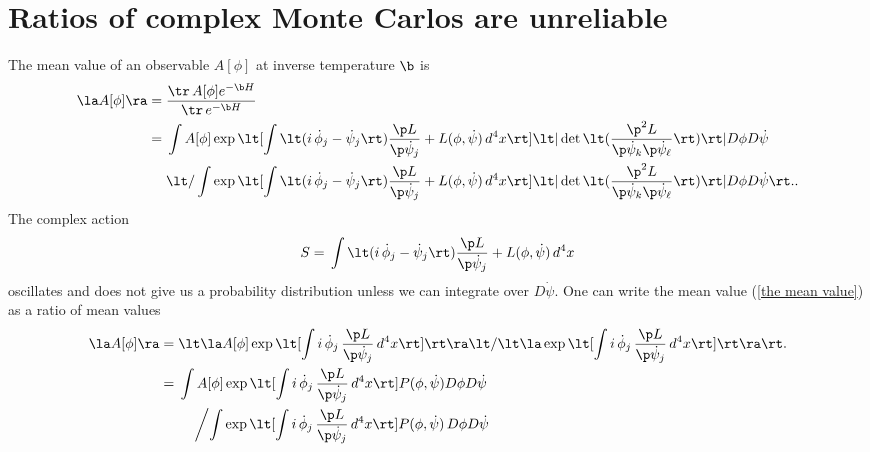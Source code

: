 \documentclass[prd,preprint,floatfix,showpacs]{revtex4-1}
\begin{document}
\appendix

\section{Ratios of complex Monte Carlos are unreliable
\label {Ratios of complex Monte Carlos are unreliable}}

The mean value of an observable
\( A[\phi] \) at inverse temperature \( \b \) is
\begin{equation}
   \begin{split}    
\la A[\phi] \ra ={}& \frac{ \tr \, A[\phi] e^{- \b H} }
{ \tr \, e^{- \b H} } \\
={}&
\int A[\phi] \exp \lt[ \int    \lt( i \, \dot \phi_j 
-  \dot \psi_j \rt) \frac{ \p  L }{ \p \dot \psi_j }  
+ L(\phi, \dot \psi) \, d^4x \rt] 
{\lt| \det \lt( \frac{ \p^2  L }
 { \p \dot \psi_k \p \dot \psi_\ell }  \rt) \rt| }
D\phi D\dot\psi 
\\
{}& \lt/ \int \exp \lt[ \int  \lt( i \, \dot \phi_j 
-  \dot \psi_j \rt) \frac{ \p  L }{ \p \dot \psi_j }  
+ L(\phi, \dot \psi) \, d^4x \rt] 
{\lt| \det \lt( \frac{ \p^2  L }
 { \p \dot \psi_k \p \dot \psi_\ell }  \rt) \rt| } 
 D\phi D\dot\psi \rt. .
 \label {the mean value}
\end{split}
\end{equation} 
The complex action 
\begin{equation}
S = {} \int \lt( i \, \dot \phi_j 
	-  \dot \psi_j \rt) \frac{ \p  L }{ \p \dot \psi_j }  
	+ L(\phi, \dot \psi)\, d^4x
	\label {the complex action}
\end{equation}
oscillates and does not give us a probability distribution
unless we can integrate over $D\dot\psi$\@.
One can write the mean value (\ref {the mean value})
as a ratio of mean values
\begin{equation}
\begin{split}    
\la A[\phi] \ra ={}& \lt\la A[\phi]
\exp \lt[ \int  i \, \dot \phi_j \,
 \frac{ \p  L }{ \p \dot \psi_j }  \, d^4x \rt]
\rt\ra
 \lt / 
\lt\la 
\exp \lt[ \int   i \, \dot \phi_j 
\, \frac{ \p  L }{ \p \dot \psi_j } \, d^4x \rt]
\rt\ra \rt. \\
={}& \int A[\phi]
\exp \lt[ \int  i \, \dot \phi_j \,
 \frac{ \p  L }{ \p \dot \psi_j }  \, d^4x \rt]
P(\phi, \dot \psi) D\phi D\dot\psi \\
{}& \quad \left/ \int \exp \lt[ \int   i \, \dot \phi_j 
\, \frac{ \p  L }{ \p \dot \psi_j } \, d^4x \rt]
P(\phi, \dot \psi) \, D\phi D\dot\psi \right.
\label {observable}
\end{split}
\end{equation}
\end{document}
